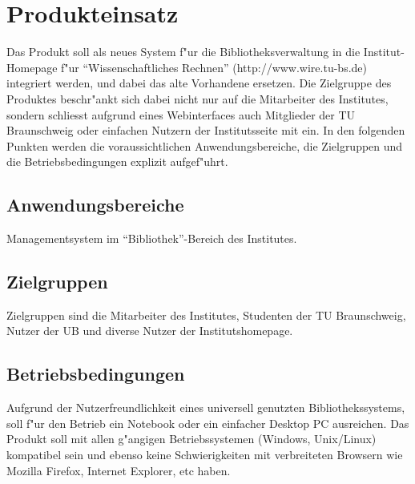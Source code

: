 \chapter{Produkteinsatz}
Das Produkt soll als neues System f"ur die Bibliotheksverwaltung in die Institut-Homepage f"ur "`Wissenschaftliches Rechnen"' (http://www.wire.tu-bs.de) integriert werden, und dabei das alte Vorhandene ersetzen. Die Zielgruppe des Produktes beschr"ankt sich dabei nicht nur auf die Mitarbeiter des Institutes, sondern schliesst aufgrund eines Webinterfaces auch Mitglieder der TU Braunschweig oder einfachen Nutzern der Institutsseite mit ein. 
In den folgenden Punkten werden die voraussichtlichen Anwendungsbereiche, die Zielgruppen und die Betriebsbedingungen explizit aufgef"uhrt. 

\section{Anwendungsbereiche}
Managementsystem im "`Bibliothek"'-Bereich des Institutes.

\section{Zielgruppen}
Zielgruppen sind die Mitarbeiter des Institutes, Studenten der TU Braunschweig, Nutzer der \gls{UB} und diverse Nutzer der Institutshomepage.

\section{Betriebsbedingungen}
Aufgrund der Nutzerfreundlichkeit eines universell genutzten Bibliothekssystems, soll 
f"ur den Betrieb ein Notebook oder ein einfacher Desktop PC ausreichen. Das Produkt soll mit allen g"angigen Betriebssystemen (Windows, Unix/Linux) kompatibel sein und ebenso keine Schwierigkeiten mit verbreiteten Browsern wie Mozilla Firefox, Internet Explorer, etc haben.  
